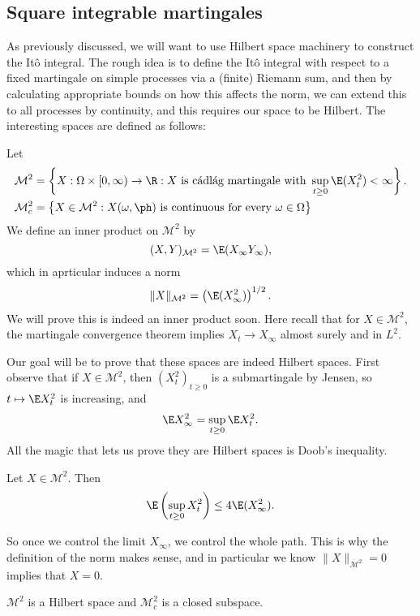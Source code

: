 \documentclass[a4paper]{article}
\begin{document}
\subsection{Square integrable martingales}
As previously discussed, we will want to use Hilbert space machinery to construct the It\^o integral. The rough idea is to define the It\^o integral with respect to a fixed martingale on simple processes via a (finite) Riemann sum, and then by calculating appropriate bounds on how this affects the norm, we can extend this to all processes by continuity, and this requires our space to be Hilbert. The interesting spaces are defined as follows:

\begin{defi}[$\mathcal{M}^2$]
  Let
  \begin{align*}
    \mathcal{M}^2 &= \left\{X : \Omega \times [0, \infty) \to \R : X\text{ is c\'adl\'ag martingale with } \sup_{t \geq 0} \E(X_t^2) < \infty\right\}.\\
    \mathcal{M}^2_c &= \left\{X \in \mathcal{M}^2: X(\omega, \ph)\text{ is continuous for every }\omega \in \Omega\right\}
  \end{align*}
  We define an inner product on $\mathcal{M}^2$ by
  \[
    (X, Y)_{\mathcal{M}^2} = \E(X_\infty Y_\infty),
  \]
  which in aprticular induces a norm
  \[
    \|X\|_{\mathcal{M}^2} = \left(\E(X_\infty^2)\right)^{1/2}.
  \]
  We will prove this is indeed an inner product soon. Here recall that for $X \in \mathcal{M}^2$, the martingale convergence theorem implies $X_t \to X_\infty$ almost surely and in $L^2$.
\end{defi}
Our goal will be to prove that these spaces are indeed Hilbert spaces. First observe that if $X \in \mathcal{M}^2$, then $(X_t^2)_{t \geq 0}$ is a submartingale by Jensen, so $t \mapsto \E X_t^2$ is increasing, and
\[
  \E X_\infty^2 = \sup_{t \geq 0} \E X_t^2.
\]
All the magic that lets us prove they are Hilbert spaces is Doob's inequality.
\begin{thm}
  Let $X \in \mathcal{M}^2$. Then
  \[
    \E \left(\sup_{t \geq 0} X_t^2\right) \leq 4 \E(X_\infty^2).
  \]
\end{thm}
So once we control the limit $X_\infty$, we control the whole path. This is why the definition of the norm makes sense, and in particular we know $\|X\|_{\mathcal{M}^2} = 0$ implies that $X = 0$.

\begin{thm}
  $\mathcal{M}^2$ is a Hilbert space and $\mathcal{M}_c^2$ is a closed subspace.
\end{thm}
\end{document}
